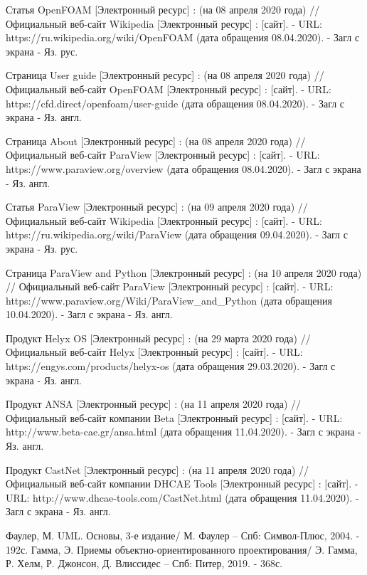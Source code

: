 \documentclass[14pt]{extreport}
\begin{document}
\begin{thebibliography}{9}

   Статья OpenFOAM [Электронный ресурс] : (на 08 апреля 2020 года) // Официальный веб-сайт Wikipedia [Электронный ресурс] : [сайт]. - URL: https://ru.wikipedia.org/wiki/OpenFOAM (дата обращения 08.04.2020). - Загл с экрана - Яз. рус.
   
   Страница User guide [Электронный ресурс] : (на 08 апреля 2020 года) // Официальный веб-сайт OpenFOAM [Электронный ресурс] : [сайт]. - URL: https://cfd.direct/openfoam/user-guide (дата обращения 08.04.2020). - Загл с экрана - Яз. англ.
   
   Страница About [Электронный ресурс] : (на 08 апреля 2020 года) // Официальный веб-сайт ParaView [Электронный ресурс] : [сайт]. - URL: https://www.paraview.org/overview (дата обращения 08.04.2020). - Загл с экрана - Яз. англ.
   
   Статья ParaView [Электронный ресурс] : (на 09 апреля 2020 года) // Официальный веб-сайт Wikipedia [Электронный ресурс] : [сайт]. - URL: https://ru.wikipedia.org/wiki/ParaView (дата обращения 09.04.2020). - Загл с экрана - Яз. рус.
   


   Страница ParaView and Python [Электронный ресурс] : (на 10 апреля 2020 года) // Официальный веб-сайт ParaView [Электронный ресурс] : [сайт]. - URL: https://www.paraview.org/Wiki/ParaView\_and\_Python (дата обращения 10.04.2020). - Загл с экрана - Яз. англ.
  
   Продукт Helyx OS [Электронный ресурс] : (на 29 марта 2020 года) // Официальный веб-сайт Helyx [Электронный ресурс] : [сайт]. - URL: https://engys.com/products/helyx-os (дата обращения 29.03.2020). - Загл с экрана - Яз. англ.
      
   Продукт ANSA [Электронный ресурс] : (на 11 апреля 2020 года) // Официальный веб-сайт компании Beta [Электронный ресурс] : [сайт]. - URL: http://www.beta-cae.gr/ansa.html (дата обращения 11.04.2020). - Загл с экрана - Яз. англ.
   
   Продукт CastNet [Электронный ресурс] : (на 11 апреля 2020 года) // Официальный веб-сайт компании DHCAE Tools [Электронный ресурс] : [сайт]. - URL: http://www.dhcae-tools.com/CastNet.html (дата обращения 11.04.2020). - Загл с экрана - Яз. англ.  

  Фаулер, М. UML. Основы, 3-е издание/ М. Фаулер -- Спб: Символ-Плюс, 2004. - 192с.
  Гамма, Э. Приемы объектно-ориентированного проектирования/ Э. Гамма, Р. Хелм, Р. Джонсон, Д. Влиссидес -- Спб: Питер, 2019. - 368с.
  

\end{thebibliography}
\end{document}
